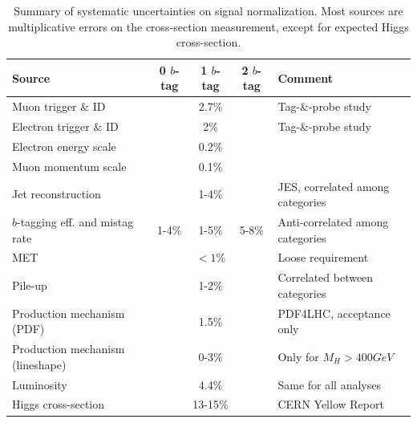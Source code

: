 \begin{table}[hb]
\caption{
Summary of systematic uncertainties on signal normalization. Most sources are multiplicative errors
on the cross-section measurement, except for expected Higgs cross-section.
}
\label{table-systematics}
\begin{center}
\footnotesize
\begin{tabular}{|l|c|c|c|p{5cm}|}
\hline
Source      &   0 $b$-tag   &   1 $b$-tag  &   2 $b$-tag  &   Comment \\ \hline \hline
Muon trigger \& ID               &  \multicolumn{3}{c|}{2.7\%}       & Tag-\&-probe study \\
Electron trigger \& ID           &  \multicolumn{3}{c|}{2\%}         & Tag-\&-probe study  \\ \hline
Electron energy scale            &  \multicolumn{3}{c|}{0.2\%}       & \\
Muon momentum scale              &  \multicolumn{3}{c|}{0.1\%}       & \\ \hline
Jet reconstruction               &  \multicolumn{3}{c|}{1-4\%}       & JES, correlated among categories \\ \hline
$b$-tagging eff. and mistag rate &  1-4\% & 1-5\% & 5-8\%            & Anti-correlated among categories \\ \hline
MET                              &  \multicolumn{3}{c|}{$<1$\%}      & Loose requirement \\ \hline
Pile-up                          &  \multicolumn{3}{c|}{1-2\%}       & Correlated between categories \\
Production mechanism (PDF)       &  \multicolumn{3}{c|}{1.5\%}       & PDF4LHC, acceptance only\\
Production mechanism (lineshape) &  \multicolumn{3}{c|}{0-3\%}       & Only for $M_H>400 GeV$  \\
Luminosity                       &  \multicolumn{3}{c|}{4.4$\%$}     & Same for all analyses \\
Higgs cross-section              &  \multicolumn{3}{c|}{13-15$\%$ }  & CERN Yellow Report   \\
\hline
\end{tabular}
\end{center}
\end{table}

